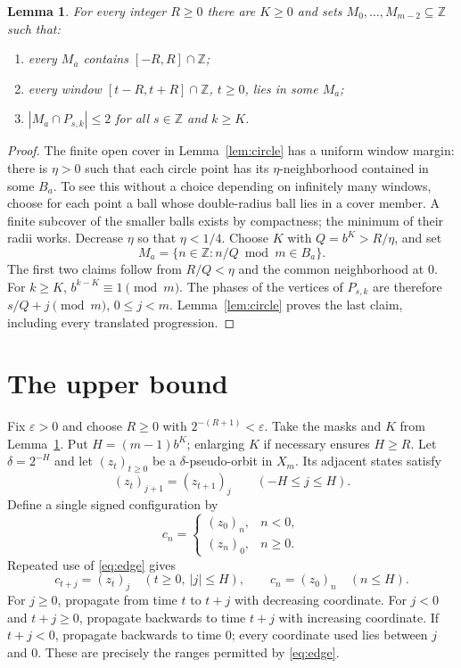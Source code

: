 \documentclass[11pt]{article}
\newtheorem{lemma}[theorem]{Lemma}
\newcommand{\Z}{\mathbb Z}
\begin{document}
\begin{lemma}\label{lem:masks}
For every integer $R\geq0$ there are $K\geq0$ and sets
$M_0,\ldots,M_{m-2}\subseteq\Z$ such that:
\begin{enumerate}
\item every $M_a$ contains $[-R,R]\cap\Z$;
\item every window $[t-R,t+R]\cap\Z$, $t\geq0$, lies in some $M_a$;
\item $|M_a\cap P_{s,k}|\leq2$ for all $s\in\Z$ and $k\geq K$.
\end{enumerate}
\end{lemma}
\begin{proof}
The finite open cover in Lemma~\ref{lem:circle} has a uniform window
margin: there is $\eta>0$ such that each circle point has its
$\eta$-neighborhood contained in some $B_a$. To see this without a
choice depending on infinitely many windows, choose for each point a
ball whose double-radius ball lies in a cover member. A finite subcover
of the smaller balls exists by compactness; the minimum of their radii
works. Decrease $\eta$ so that $\eta<1/4$.
Choose $K$ with $Q=b^K>R/\eta$, and set
\[
 M_a=\{n\in\Z:n/Q\bmod m\in B_a\}.
\]
The first two claims follow from $R/Q<\eta$ and the common
neighborhood at $0$. For $k\geq K$, $b^{k-K}\equiv1\pmod m$.
The phases of the vertices of $P_{s,k}$ are therefore
$s/Q+j\pmod m$, $0\leq j<m$. Lemma~\ref{lem:circle} proves the last
claim, including every translated progression.
\end{proof}

\section{The upper bound}
Fix $\varepsilon>0$ and choose $R\geq0$ with
$2^{-(R+1)}<\varepsilon$. Take the masks and $K$ from
Lemma~\ref{lem:masks}. Put $H=(m-1)b^K$; enlarging $K$ if necessary
ensures $H\geq R$. Let $\delta=2^{-H}$ and let $(z_t)_{t\geq0}$ be
a $\delta$-pseudo-orbit in $X_m$. Its adjacent states satisfy
\begin{equation}\label{eq:edge}
 (z_t)_{j+1}=(z_{t+1})_j\qquad(-H\leq j\leq H).
\end{equation}
Define a single signed configuration by
\[
 c_n=\begin{cases}(z_0)_n,&n<0,\\(z_n)_0,&n\geq0.\end{cases}
\]
Repeated use of \eqref{eq:edge} gives
\begin{equation}\label{eq:overlap}
 c_{t+j}=(z_t)_j\quad(t\geq0,\ |j|\leq H),
 \qquad c_n=(z_0)_n\quad(n\leq H).
\end{equation}
For $j\geq0$, propagate from time $t$ to $t+j$ with decreasing
coordinate. For $j<0$ and $t+j\geq0$, propagate backwards to time
$t+j$ with increasing coordinate. If $t+j<0$, propagate backwards
to time $0$; every coordinate used lies between $j$ and $0$.
These are precisely the ranges permitted by \eqref{eq:edge}.
\end{document}
